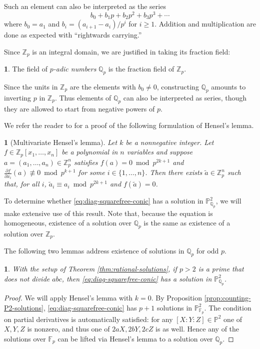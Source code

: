 \documentclass[10pt,a4paper]{amsart}
\numberwithin{equation}{section}
\numberwithin{figure}{section}
\numberwithin{table}{section}
\theoremstyle{definition}
\theoremstyle{plain}
\theoremstyle{remark}
\theoremstyle{plain}
\theoremstyle{definition}
\newtheorem{defn}[thm]{\protect\definitionname}
\theoremstyle{plain}
\theoremstyle{plain}
\newtheorem{lem}[thm]{\protect\lemmaname}
\providecommand{\definitionname}{Definition}
\providecommand{\lemmaname}{Lemma}
\renewcommand{\P}{\mathbb{P}}
\newcommand{\F}{\mathbb{F}}
\newcommand{\Z}{\mathbb{Z}}
\newcommand{\Q}{\mathbb{Q}}
\begin{document}
	Such an element can also be interpreted as the series
	\[
	b_0 + b_1 p + b_2 p^2 + b_3 p^3 + \cdots
	\]
	where $b_0 = a_1$ and $b_i = (a_{i+1} - a_i)/p^i$ for $i \geq 1$. Addition and multiplication are done as expected with ``rightwards carrying.''
	
	Since $\Z_p$ is an integral domain, we are justified in taking its fraction field:
	\begin{defn}
		The field of \emph{$p$-adic numbers} $\Q_p$ is the fraction field of $\Z_p$.
	\end{defn}
	Since the units in $\Z_p$ are the elements with $b_0 \neq 0$, constructing $\Q_p$ amounts to inverting $p$ in $\Z_p$. Thus elements of $\Q_p$ can also be interpreted as series, though they are allowed to start from negative powers of $p$.
	
	We refer the reader to \cite[Thm.~6.7]{bilu} for a proof of the following formulation of Hensel's lemma.
	\begin{lem}[Multivariate Hensel's lemma]\label{thm:hensels-one-eq}
		Let $k$ be a nonnegative integer. Let $f \in \Z_p[x_1,\ldots,x_n]$ be a polynomial in $n$ variables and suppose $a = (a_1,\ldots,a_n)\in \Z_p^n$ satisfies $f(a) = 0 \bmod {p^{2k+1}}$ and $\frac{\partial f}{\partial x_i}(a) \not\equiv 0 \bmod {p^{k+1}}$ for some $i\in \{1,\ldots,n\}$. Then there exists $\widetilde{a} \in \Z_p^n$ such that, for all $i$, $\widetilde{a}_i\equiv a_i \bmod {p^{2k+1}}$ and $f(\widetilde{a}) = 0$.
	\end{lem}
	To determine whether \eqref{eq:diag-squarefree-conic} has a solution in $\P^2_{\Q_p}$, we will make extensive use of this result. Note that, because the equation is homogeneous, existence of a solution over $\Q_p$ is the same as existence of a solution over $\Z_p$.
	
	The following two lemmas address existence of solutions in $\Q_p$ for odd $p$.
	\begin{lem}
		With the setup of Theorem \ref{thm:rational-solutions}, if $p > 2$ is a prime that does not divide $abc$, then \eqref{eq:diag-squarefree-conic} has a solution in $\P^2_{\Q_p}$.
	\end{lem}
	\begin{proof}
		We will apply Hensel's lemma with $k=0$. By Proposition \ref{prop:counting-P2-solutions}, \eqref{eq:diag-squarefree-conic} has $p+1$ solutions in $\P^2_{\F_p}$. The condition on partial derivatives is automatically satisfied: for any $[X:Y:Z]\in \P^2$ one of $X,Y,Z$ is nonzero, and thus one of $2aX, 2bY, 2cZ$ is as well. Hence any of the solutions over $\F_p$ can be lifted via Hensel's lemma to a solution over $\Q_p$.
	\end{proof}
	
\end{document}
